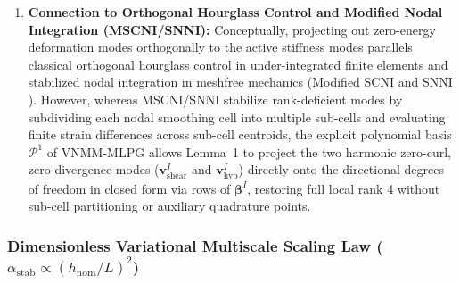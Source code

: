 \documentclass[preprint,12pt]{elsarticle}
\begin{document}
\begin{enumerate}
    \item \textbf{Connection to Orthogonal Hourglass Control and Modified Nodal Integration (MSCNI/SNNI):} Conceptually, projecting out zero-energy deformation modes orthogonally to the active stiffness modes parallels classical orthogonal hourglass control in under-integrated finite elements \cite{flanagan1981uniform} and stabilized nodal integration in meshfree mechanics (Modified SCNI and SNNI \cite{chen2001stabilized, chen2013arbitrary, hillman2018performance}). However, whereas MSCNI/SNNI stabilize rank-deficient modes by subdividing each nodal smoothing cell into multiple sub-cells and evaluating finite strain differences across sub-cell centroids, the explicit polynomial basis $\mathcal{P}^1$ of VNMM-MLPG allows Lemma~1 to project the two harmonic zero-curl, zero-divergence modes ($\mathbf{v}_{\mathrm{shear}}^I$ and $\mathbf{v}_{\mathrm{hyp}}^I$) directly onto the directional degrees of freedom in closed form via rows of $\boldsymbol{\beta}^I$, restoring full local rank 4 without sub-cell partitioning or auxiliary quadrature points.
\end{enumerate}

\subsubsection{Dimensionless Variational Multiscale Scaling Law (\texorpdfstring{$\alpha_{\mathrm{stab}} \propto (h_{\mathrm{nom}}/L)^2$}{alpha\_stab proportional to (h\_nom/L)2})}
\label{subsubsec:vms_scaling_law}
\end{document}
